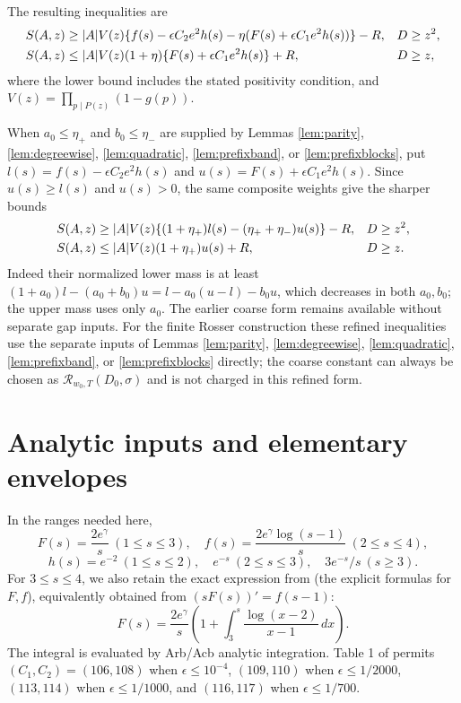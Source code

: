 \documentclass[11pt]{article}
\begin{document}
The resulting inequalities are
\begin{align}\label{eq:sieve}
S(A,z)&\ge|A|V(z)\{f(s)-\epsilon C_2 e^2h(s)
-\eta(F(s)+\epsilon C_1e^2h(s))\}-R,
&&D\ge z^2,\notag\\
S(A,z)&\le|A|V(z)(1+\eta)\{F(s)+\epsilon C_1 e^2h(s)\}+R,
&&D\ge z,
\end{align}
where the lower bound includes the stated positivity condition, and
$V(z)=\prod_{p\mid P(z)}(1-g(p))$.

When $a_0\le\eta_+$ and $b_0\le\eta_-$ are supplied by Lemmas
\ref{lem:parity}, \ref{lem:degreewise}, \ref{lem:quadratic},
\ref{lem:prefixband}, or \ref{lem:prefixblocks}, put
$l(s)=f(s)-\epsilon C_2e^2h(s)$ and
$u(s)=F(s)+\epsilon C_1e^2h(s)$. Since $u(s)\ge l(s)$ and $u(s)>0$,
the same composite weights give the sharper bounds
\begin{align}\label{eq:sieveparity}
S(A,z)&\ge |A|V(z)\{(1+\eta_+)l(s)-(\eta_++\eta_-)u(s)\}-R,
&&D\ge z^2,\notag\\
S(A,z)&\le |A|V(z)(1+\eta_+)u(s)+R,
&&D\ge z.
\end{align}
Indeed their normalized lower mass is at least
$(1+a_0)l-(a_0+b_0)u=l-a_0(u-l)-b_0u$,
which decreases in both $a_0,b_0$; the upper mass uses only $a_0$.
The earlier coarse form remains available without separate gap inputs.
For the finite Rosser construction these refined inequalities use the
separate inputs of Lemmas \ref{lem:parity}, \ref{lem:degreewise},
\ref{lem:quadratic}, \ref{lem:prefixband}, or \ref{lem:prefixblocks}
directly; the coarse constant can always be chosen as
$\mathcal R_{w_0,T}(D_0,\sigma)$ and is not charged in this refined form.

\section{Analytic inputs and elementary envelopes}
In the ranges needed here,
\[
F(s)=\frac{2e^\gamma}{s}\ (1\le s\le3),\quad
f(s)=\frac{2e^\gamma\log(s-1)}s\ (2\le s\le4),
\]
\[
h(s)=e^{-2}\ (1\le s\le2),\quad e^{-s}\ (2\le s\le3),
\quad 3e^{-s}/s\ (s\ge3).
\]
For $3\le s\le4$, we also retain the exact expression from
\cite{BJS} (the explicit formulas for $F,f$), equivalently obtained
from $(sF(s))'=f(s-1)$:
\begin{equation}\label{eq:F34}
F(s)=\frac{2e^\gamma}{s}
\left(1+\int_3^s\frac{\log(x-2)}{x-1}\,dx\right).
\end{equation}
The integral is evaluated by Arb/Acb analytic integration.
Table 1 of \cite{BJS} permits $(C_1,C_2)=(106,108)$ when
$\epsilon\le10^{-4}$, $(109,110)$ when $\epsilon\le1/2000$,
$(113,114)$ when $\epsilon\le1/1000$,
and $(116,117)$ when $\epsilon\le1/700$.
\end{document}
